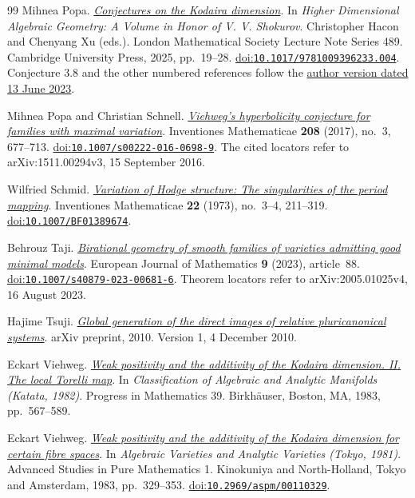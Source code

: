\begin{thebibliography}{99}
Mihnea Popa.
\emph{\href{https://people.math.harvard.edu/~mpopa/papers/kodaira.pdf}{Conjectures on the {Kodaira} dimension}}.
In \emph{Higher Dimensional Algebraic Geometry: A Volume in Honor of {V. V. Shokurov}}.
Christopher Hacon and Chenyang Xu (eds.).
London Mathematical Society Lecture Note Series 489.
Cambridge University Press, 2025, pp.~19--28.
\href{https://doi.org/10.1017/9781009396233.004}{doi:\nolinkurl{10.1017/9781009396233.004}}.
Conjecture 3.8 and the other numbered references follow the \href{https://people.math.harvard.edu/~mpopa/papers/kodaira.pdf}{author version dated 13 June 2023}.

Mihnea Popa and Christian Schnell.
\emph{\href{https://arxiv.org/abs/1511.00294v3}{{Viehweg}'s hyperbolicity conjecture for families with maximal variation}}.
Inventiones Mathematicae \textbf{208} (2017), no.~3, 677--713.
\href{https://doi.org/10.1007/s00222-016-0698-9}{doi:\nolinkurl{10.1007/s00222-016-0698-9}}.
The cited locators refer to arXiv:1511.00294v3, 15 September 2016.

Wilfried Schmid.
\emph{\href{https://doi.org/10.1007/BF01389674}{Variation of {Hodge} structure: The singularities of the period mapping}}.
Inventiones Mathematicae \textbf{22} (1973), no.~3--4, 211--319.
\href{https://doi.org/10.1007/BF01389674}{doi:\nolinkurl{10.1007/BF01389674}}.

Behrouz Taji.
\emph{\href{https://arxiv.org/abs/2005.01025v4}{Birational geometry of smooth families of varieties admitting good minimal models}}.
European Journal of Mathematics \textbf{9} (2023), article~88.
\href{https://doi.org/10.1007/s40879-023-00681-6}{doi:\nolinkurl{10.1007/s40879-023-00681-6}}.
Theorem locators refer to arXiv:2005.01025v4, 16 August 2023.

Hajime Tsuji.
\emph{\href{https://arxiv.org/abs/1012.0884v1}{Global generation of the direct images of relative pluricanonical systems}}.
arXiv preprint, 2010.
Version 1, 4 December 2010.

Eckart Viehweg.
\emph{\href{https://esaga.uni-due.de/eckart.viehweg/ecpubl/}{Weak positivity and the additivity of the {Kodaira} dimension. {II}. {The} local {Torelli} map}}.
In \emph{Classification of Algebraic and Analytic Manifolds (Katata, 1982)}.
Progress in Mathematics 39.
Birkh{\"a}user, Boston, MA, 1983, pp.~567--589.

Eckart Viehweg.
\emph{\href{https://esaga.uni-due.de/eckart.viehweg/ecpubl/}{Weak positivity and the additivity of the {Kodaira} dimension for certain fibre spaces}}.
In \emph{Algebraic Varieties and Analytic Varieties (Tokyo, 1981)}.
Advanced Studies in Pure Mathematics 1.
Kinokuniya and North-Holland, Tokyo and Amsterdam, 1983, pp.~329--353.
\href{https://doi.org/10.2969/aspm/00110329}{doi:\nolinkurl{10.2969/aspm/00110329}}.


\end{thebibliography}
